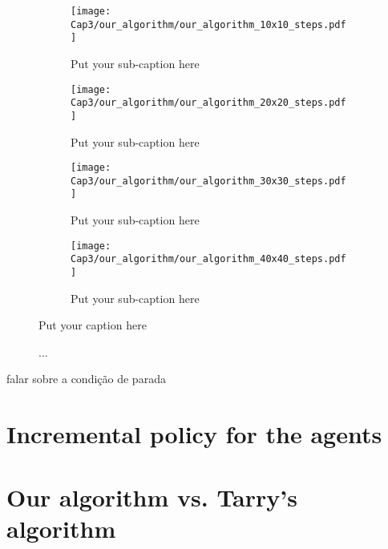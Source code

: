 \begin{figure}
\centering
\begin{subfigure}{.5\textwidth}
  \centering
  \texttt{[image: Cap3/our\_algorithm/our\_algorithm\_10x10\_steps.pdf]}  
  \caption{Put your sub-caption here}
  \label{fig:sub-first}
\end{subfigure}
\begin{subfigure}{.5\textwidth}
  \centering
  \texttt{[image: Cap3/our\_algorithm/our\_algorithm\_20x20\_steps.pdf]}  
  \caption{Put your sub-caption here}
  \label{fig:sub-second}
\end{subfigure}

\newline

\begin{subfigure}{.5\textwidth}
  \centering
  \texttt{[image: Cap3/our\_algorithm/our\_algorithm\_30x30\_steps.pdf]}  
  \caption{Put your sub-caption here}
  \label{fig:sub-third}
\end{subfigure}
\begin{subfigure}{.5\textwidth}
  \centering
  \texttt{[image: Cap3/our\_algorithm/our\_algorithm\_40x40\_steps.pdf]}  
  \caption{Put your sub-caption here}
  \label{fig:sub-fourth}
\end{subfigure}
\caption{Put your caption here}
\label{fig:fig}
\end{figure}

\begin{figure}
    \centering
    \qquad
    \qquad
    \newline
    \caption{...}
    \label{maze_example}
\end{figure}



falar sobre a condição de parada 

\section{Incremental policy for the agents}
\label{section_results_incremental_policy}

\section{Our algorithm vs. Tarry's algorithm}
\label{section_results_tarry_vs_our}